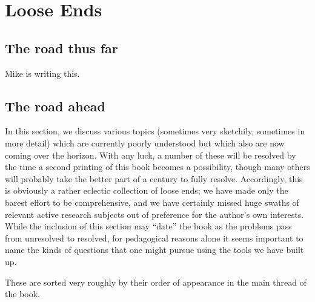 
\chapter{Loose Ends}








\section{The road thus far}

\begin{center}
\Huge Mike is writing this.
\end{center}






\section{The road ahead}\label{OpenQuestionsSection}




In this section, we discuss various topics (sometimes very sketchily, sometimes in more detail) which are currently poorly understood but which also are now coming over the horizon.  With any luck, a number of these will be resolved by the time a second printing of this book becomes a possibility, though many others will probably take the better part of a century to fully resolve.  Accordingly, this is obviously a rather eclectic collection of loose ends; we have made only the barest effort to be comprehensive, and we have certainly missed huge swaths of relevant active research subjects out of preference for the author's own interests.  While the inclusion of this section may ``date'' the book as the problems pass from unresolved to resolved, for pedagogical reasons alone it seems important to name the kinds of questions that one might pursue using the tools we have built up.

These are sorted very roughly by their order of appearance in the main thread of the book.








